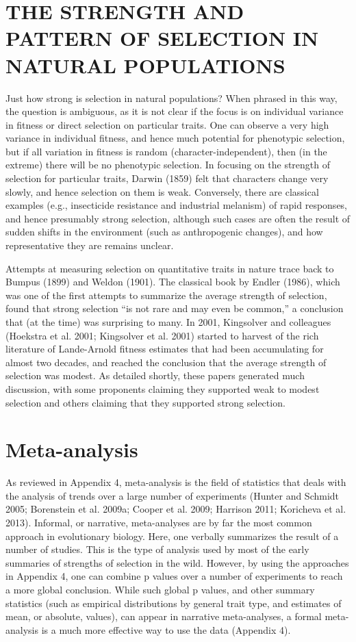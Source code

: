 \documentclass{article}
\begin{document}
\section{THE STRENGTH AND PATTERN OF SELECTION IN NATURAL POPULATIONS}
Just how strong is selection in natural populations? When phrased in this way, the question is ambiguous, as it is not clear if the focus is on individual variance in fitness or direct selection on particular traits. One can observe a very high variance in individual fitness, and hence much potential for phenotypic selection, but if all variation in fitness is random (character-independent), then (in the extreme) there will be no phenotypic selection. In focusing on the strength of selection for particular traits, Darwin (1859) felt that characters change very slowly, and hence selection on them is weak. Conversely, there are classical examples (e.g., insecticide resistance and industrial melanism) of rapid responses, and hence presumably strong selection, although such cases are often the result of sudden shifts in the environment (such as anthropogenic changes), and how representative they are remains unclear.

Attempts at measuring selection on quantitative traits in nature trace back to Bumpus (1899) and Weldon (1901). The classical book by Endler (1986), which was one of the first attempts to summarize the average strength of selection, found that strong selection “is not rare and may even be common,” a conclusion that (at the time) was surprising to many. In 2001, Kingsolver and colleagues (Hoekstra et al. 2001; Kingsolver et al. 2001) started to harvest of the rich literature of Lande-Arnold fitness estimates that had been accumulating for almost two decades, and reached the conclusion that the average strength of selection was modest. As detailed shortly, these papers generated much discussion, with some proponents claiming they supported weak to modest selection and others claiming that they supported strong selection.

\section{Meta-analysis}
As reviewed in Appendix 4, meta-analysis is the field of statistics that deals with the analysis of trends over a large number of experiments (Hunter and Schmidt 2005; Borenstein et al. 2009a; Cooper et al. 2009; Harrison 2011; Koricheva et al. 2013). Informal, or narrative, meta-analyses are by far the most common approach in evolutionary biology. Here, one verbally summarizes the result of a number of studies. This is the type of analysis used by most of the early summaries of strengths of selection in the wild. However, by using the approaches in Appendix 4, one can combine p values over a number of experiments to reach a more global conclusion. While such global p values, and other summary statistics (such as empirical distributions by general trait type, and estimates of mean, or absolute, values), can appear in narrative meta-analyses, a formal meta-analysis is a much more effective way to use the data (Appendix 4).
\end{document}
